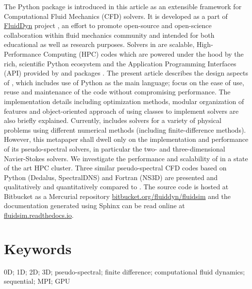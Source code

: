 \documentclass{../jors}
\begin{document}

The Python package  is introduced in this article as an extensible
framework for Computational Fluid Mechanics (CFD) solvers.
%
It is developed as a part of \href{https://fluiddyn.readthedocs.io}{FluidDyn}
project \citep{fluiddyn}, an effort to promote open-source and open-science
collaboration within fluid mechanics community and intended for both educational
as well as research purposes.
%
Solvers in  are scalable, High-Performance Computing (HPC) codes
which are powered under the hood by the rich, scientific Python ecosystem and the
Application Programming Interfaces (API) provided by  and
 packages \citep{fluidfft}.
%
The present article describes the design aspects of , which
includes use of Python as the main language; focus on the ease of use, reuse
and maintenance of the code without compromising performance.
%
The implementation details including optimization methods, modular organization
of features and object-oriented approach of using classes to implement solvers
are also briefly explained.
%
Currently,  includes solvers for a variety of physical problems
using different numerical methods (including finite-difference methods).
%
However, this metapaper shall dwell only on the implementation and performance
of its pseudo-spectral solvers, in particular the two- and three-dimensional
Navier-Stokes solvers.
%
We investigate the performance and scalability of  in a
state of the art HPC cluster.
%
Three similar pseudo-spectral CFD codes based on Python (Dedalus, SpectralDNS) and
Fortran (NS3D) are presented and qualitatively and quantitatively compared to
.
%
The source code is hosted at Bitbucket as a Mercurial repository
\href{https://bitbucket.org/fluiddyn/fluidsim}{bitbucket.org/fluiddyn/fluidsim}
and the documentation generated using Sphinx can be read online at
\href{https://fluidsim.readthedocs.io}{fluidsim.readthedocs.io}.

\section*{Keywords}

0D; 1D; 2D; 3D; pseudo-spectral; finite difference; computational fluid
dynamics; sequential; MPI; GPU
\end{document}
